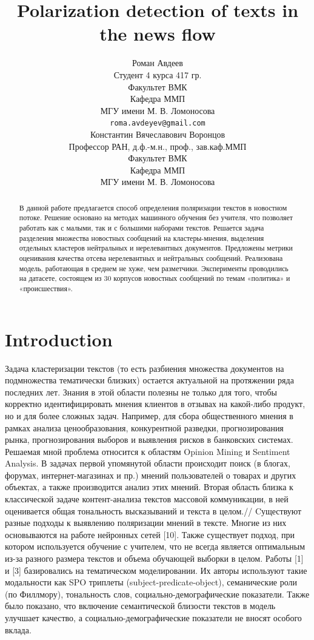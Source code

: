 \documentclass{article}
\title{Polarization detection of texts in the news flow}
\author{Роман Авдеев \\
	Студент 4 курса 417 гр.\\
	Факультет ВМК\\
        Кафедра ММП\\
	МГУ имени М. В. Ломоносова \\
	\texttt{roma.avdeyev@gmail.com} \\
	\And
	Константин Вячеславович Воронцов\\
        Профессор РАН, д.ф.-м.н., проф., зав.каф.ММП\\
	Факультет ВМК\\
        Кафедра ММП\\
	МГУ имени М. В. Ломоносова \\
}
\date{}
\begin{document}
\maketitle

\begin{abstract}
	В данной работе предлагается способ определения поляризации текстов в новостном потоке. Решение основано на методах машинного обучения без учителя, что позволяет работать как с малыми, так и с большими наборами текстов. Решается задача разделения множества новостных сообщений на кластеры-мнения, выделения отдельных кластеров нейтральных и нерелевантных документов. Предложены метрики оценивания качества отсева нерелевантных и нейтральных сообщений. Реализована модель, работающая в среднем не хуже, чем разметчики. Эксперименты проводились на датасете, состоящем из 30 корпусов новостных сообщений по темам «политика» и «происшествия».
\end{abstract}



\section{Introduction}
Задача кластеризации текстов (то есть разбиения множества документов на подмножества тематически близких) остается актуальной на протяжении ряда последних лет. Знания в этой области полезны не только для того, чтобы корректно идентифицировать мнения клиентов в отзывах на какой-либо продукт, но и для более сложных задач. Например, для сбора общественного мнения в рамках анализа ценообразования, конкурентной разведки, прогнозирования рынка, прогнозирования выборов и выявления рисков в банковских системах. \\

Решаемая мной проблема относится к областям Opinion Mining и Sentiment Analysis. В задачах первой упомянутой области происходит поиск (в блогах, форумах, интернет-магазинах и пр.) мнений пользователей о товарах и других объектах, а также производится анализ этих мнений. Вторая область близка к классической задаче контент-анализа текстов массовой коммуникации, в ней оценивается общая тональность высказываний и текста в целом.//
Cуществуют разные подходы к выявлению поляризации мнений в тексте. Многие из них основываются на работе нейронных сетей [10]. Также существует подход, при котором используется обучение с учителем, что не всегда является оптимальным из-за разного размера текстов и объема обучающей выборки в целом. Работы [1] и [3] базировались на тематическом моделировании. Их авторы используют такие модальности как SPO триплеты (subject-predicate-object), семанические роли (по Филлмору), тональность слов, социально-демографические показатели. Также было показано, что включение семантической близости текстов в модель улучшает качество, а социально-демографические показатели не вносят особого вклада.\\
\end{document}

